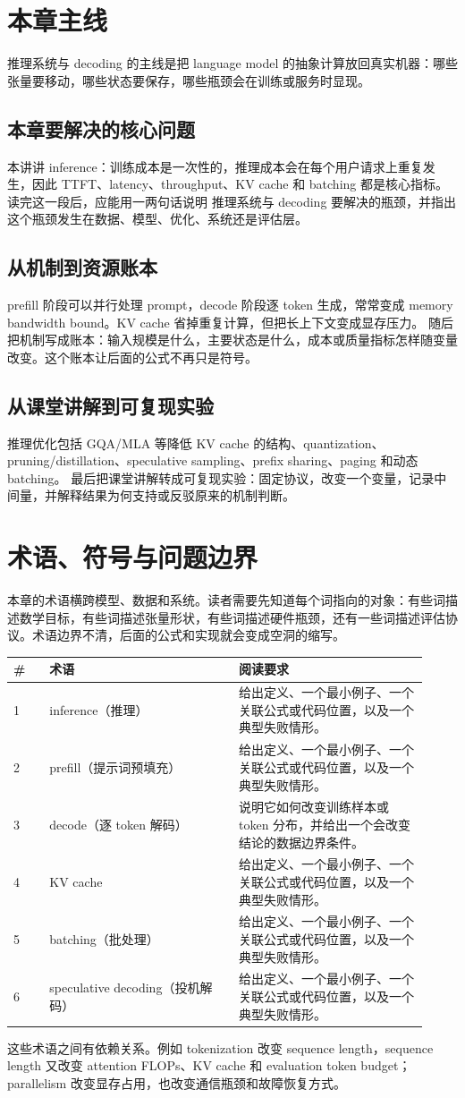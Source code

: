\documentclass[a4paper]{article}
\begin{document}
\section{本章主线}
推理系统与 decoding 的主线是把 language model 的抽象计算放回真实机器：哪些张量要移动，哪些状态要保存，哪些瓶颈会在训练或服务时显现。
\subsection{本章要解决的核心问题}
本讲讲 inference：训练成本是一次性的，推理成本会在每个用户请求上重复发生，因此 TTFT、latency、throughput、KV cache 和 batching 都是核心指标。
读完这一段后，应能用一两句话说明 推理系统与 decoding 要解决的瓶颈，并指出这个瓶颈发生在数据、模型、优化、系统还是评估层。
\subsection{从机制到资源账本}
prefill 阶段可以并行处理 prompt，decode 阶段逐 token 生成，常常变成 memory bandwidth bound。KV cache 省掉重复计算，但把长上下文变成显存压力。
随后把机制写成账本：输入规模是什么，主要状态是什么，成本或质量指标怎样随变量改变。这个账本让后面的公式不再只是符号。
\subsection{从课堂讲解到可复现实验}
推理优化包括 GQA/MLA 等降低 KV cache 的结构、quantization、pruning/distillation、speculative sampling、prefix sharing、paging 和动态 batching。
最后把课堂讲解转成可复现实验：固定协议，改变一个变量，记录中间量，并解释结果为何支持或反驳原来的机制判断。
\section{术语、符号与问题边界}
本章的术语横跨模型、数据和系统。读者需要先知道每个词指向的对象：有些词描述数学目标，有些词描述张量形状，有些词描述硬件瓶颈，还有一些词描述评估协议。术语边界不清，后面的公式和实现就会变成空洞的缩写。
\begin{longtable}{p{0.08\linewidth}p{0.42\linewidth}p{0.42\linewidth}}
\toprule
\textbf{\#} & \textbf{术语} & \textbf{阅读要求}\\
\midrule
1 & inference（推理） & 给出定义、一个最小例子、一个关联公式或代码位置，以及一个典型失败情形。\\
2 & prefill（提示词预填充） & 给出定义、一个最小例子、一个关联公式或代码位置，以及一个典型失败情形。\\
3 & decode（逐 token 解码） & 说明它如何改变训练样本或 token 分布，并给出一个会改变结论的数据边界条件。\\
4 & KV cache & 给出定义、一个最小例子、一个关联公式或代码位置，以及一个典型失败情形。\\
5 & batching（批处理） & 给出定义、一个最小例子、一个关联公式或代码位置，以及一个典型失败情形。\\
6 & speculative decoding（投机解码） & 给出定义、一个最小例子、一个关联公式或代码位置，以及一个典型失败情形。\\
\bottomrule
\end{longtable}
这些术语之间有依赖关系。例如 tokenization 改变 sequence length，sequence length 又改变 attention FLOPs、KV cache 和 evaluation token budget；parallelism 改变显存占用，也改变通信瓶颈和故障恢复方式。
\end{document}

